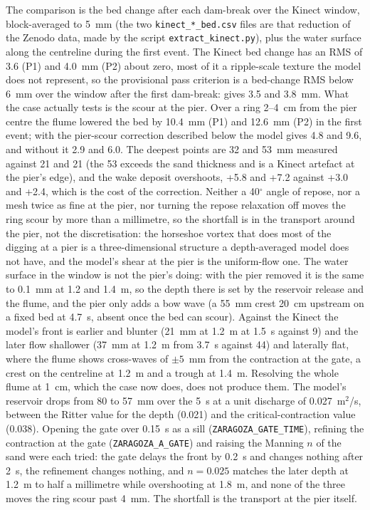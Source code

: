 The comparison is the bed change after each dam-break over the Kinect
window, block-averaged to 5~mm (the two \texttt{kinect\_*\_bed.csv} files
are that reduction of the Zenodo data, made by the script
\texttt{extract\_kinect.py}), plus the water surface along the centreline
during the first event. The Kinect bed change has an RMS of 3.6 (P1) and
4.0~mm (P2) about zero, most of it a ripple-scale texture the model does
not represent, so the provisional pass criterion is a bed-change RMS below
6~mm over the window after the first dam-break: \anuga{} gives 3.5 and
3.8~mm. What the case actually tests is the scour at the pier. Over a ring
2--4~cm from the pier centre the flume lowered the bed by 10.4~mm (P1) and
12.6~mm (P2) in the first event; with the pier-scour correction described
below the model gives 4.8 and 9.6, and without it 2.9 and 6.0. The deepest
points are 32 and 53~mm measured against 21 and 21 (the 53 exceeds the
sand thickness and is a Kinect artefact at the pier's edge), and the wake
deposit overshoots, +5.8 and +7.2 against +3.0 and +2.4, which is the cost
of the correction. Neither a 40$^\circ$ angle of repose, nor a mesh
twice as fine at the pier, nor turning the repose relaxation off moves the
ring scour by more than a millimetre, so the shortfall is in the transport
around the pier, not the discretisation: the horseshoe vortex that does
most of the digging at a pier is a three-dimensional structure a
depth-averaged model does not have, and the model's shear at the pier is
the uniform-flow one. The water surface in the window is not the pier's doing: with the pier
removed it is the same to 0.1~mm at 1.2 and 1.4~m, so the depth there is
set by the reservoir release and the flume, and the pier only adds a bow
wave (a 55~mm crest 20~cm upstream on a fixed bed at 4.7~s, absent once
the bed can scour). Against the Kinect the model's front is earlier and
blunter (21~mm at 1.2~m at 1.5~s against 9) and the later flow shallower
(37~mm at 1.2~m from 3.7~s against 44) and laterally flat, where the flume
shows cross-waves of $\pm 5$~mm from the contraction at the gate, a crest
on the centreline at 1.2~m and a trough at 1.4~m. Resolving the whole flume
at 1~cm, which the case now does, does not produce them. The model's reservoir drops from 80 to
57~mm over the 5~s at a unit discharge of 0.027~m$^2$/s, between the
Ritter value for the depth (0.021) and the critical-contraction value
(0.038). Opening the gate over 0.15~s as a sill (\texttt{ZARAGOZA\_GATE\_TIME}),
refining the contraction at the gate (\texttt{ZARAGOZA\_A\_GATE}) and
raising the Manning $n$ of the sand were each tried: the gate delays the
front by 0.2~s and changes nothing after 2~s, the refinement changes
nothing, and $n = 0.025$ matches the later depth at 1.2~m to half a
millimetre while overshooting at 1.8~m, and none of the three moves the
ring scour past 4~mm. The shortfall is the transport at the pier itself.

